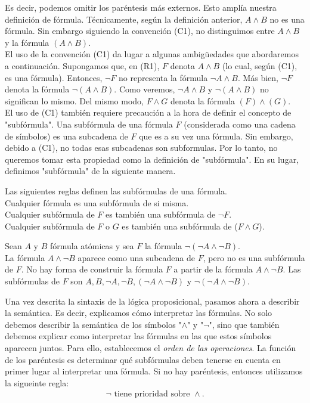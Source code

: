\documentclass[12pt,a4paper]{book}
\newcommand{\comillas}[1]{"#1"}
\begin{document}
    Es decir, podemos omitir los paréntesis más externos. Esto amplía nuestra definición de fórmula. Técnicamente, según la definición
    anterior, $A\wedge B$ no es una fórmula. Sin embargo siguiendo la convención (C1), no distinguimos entre $A\wedge B$ y la
    fórmula $(A\wedge B)$.\\
    El uso de la convención (C1) da lugar a algunas ambigüedades que abordaremos a continuación. Supongamos que, en (R1), $F$ denota
    $A\wedge B$ (lo cual, según (C1), es una fórmula). Entonces, $\neg F$ no representa la fórmula $\neg A\wedge B$. Más bien, $\neg F$
    denota la fórmula $\neg(A\wedge B)$. Como veremos, $\neg A\wedge B$ y $\neg(A\wedge B)$ no significan lo mismo. Del mismo modo,
    $F\wedge G$ denota la fórmula $(F)\wedge (G)$.\\
    El uso de (C1) también requiere precaución a la hora de definir el concepto de \comillas{subfórmula}. Una subfórmula de una fórmula
    $F$ (considerada como una cadena de símbolos) es una subcadena de $F$ que es a su vez una fórmula. Sin embargo, debido a (C1), no todas esas
    subcadenas son subformulas. Por lo tanto, no queremos tomar esta propiedad como la definición de \comillas{subfórmula}. En su lugar,
    definimos \comillas{subfórmula} de la siguiente manera.

    \begin{definicion}[Subfórmula]
        Las siguientes reglas definen las subfórmulas de una fórmula.\\
        Cualquier fórmula es una subfórmula de si misma.\\
        Cualquier subfórmula de $F$ es también una subfórmula de $\neg F$.\\
        Cualquier subfórmula de $F$ o $G$ es también una subfórmula de ($F\wedge G$).
    \end{definicion}

    \begin{ejemplo}
        Sean $A$ y $B$ fórmula atómicas y sea $F$ la fórmula $\neg(\neg A\wedge\neg B)$.\\
        La fórmula $A\wedge\neg B$ aparece como una subcadena de $F$, pero no es una subfórmula de $F$. No hay forma de construir
        la fórmula $F$ a partir de la fórmula $A\wedge\neg B$. Las subfórmulas de $F$ son $A,B,\neg A,\neg B,(\neg A\wedge \neg B)$
        y $\neg(\neg A\wedge \neg B)$.
    \end{ejemplo}

    Una vez descrita la sintaxis de la lógica proposicional, pasamos ahora a describir la semántica. Es decir, explicamos cómo interpretar
    las fórmulas. No solo debemos describir la semántica de los símbolos \comillas{$\wedge$} y \comillas{$\neg$}, sino que también debemos explicar
    como interpretar las fórmulas en las que estos símbolos aparecen juntos. Para ello, establecemos el \textit{orden de las operaciones}.
    La función de los paréntesis es determinar qué subfórmulas deben tenerse en cuenta en primer lugar al interpretar una fórmula. Si no hay paréntesis,
    entonces utilizamos la sigueinte regla:
    \begin{gather*}
        \neg\text{ tiene prioridad sobre }\wedge.
    \end{gather*}
\end{document}
